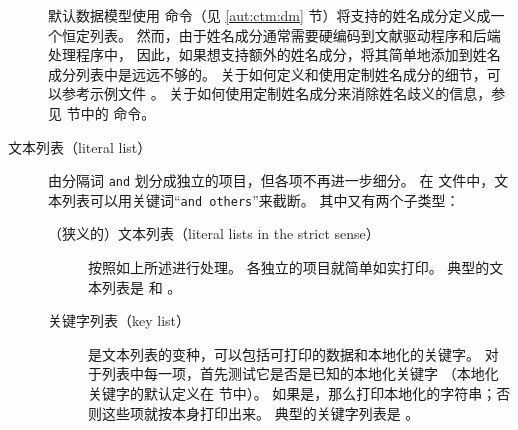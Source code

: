 \begin{description}

默认数据模型使用  命令（见 \ref{aut:ctm:dm} 节）将支持的姓名成分定义成一个恒定列表。
然而，由于姓名成分通常需要硬编码到文献驱动程序和后端处理程序中，
因此，如果想支持额外的姓名成分，将其简单地添加到姓名成分列表中是远远不够的。
关于如何定义和使用定制姓名成分的细节，可以参考示例文件 。
关于如何使用定制姓名成分来消除姓名歧义的信息，参见  节中的  命令。

\item[文本列表（literal list）] 由分隔词 \texttt{and} 划分成独立的项目，但各项不再进一步细分。
在  文件中，文本列表可以用关键词“\texttt{and others}”来截断。
其中又有两个子类型：

\begin{description}

\item[（狭义的）文本列表（literal lists in the strict sense）] 按照如上所述进行处理。
各独立的项目就简单如实打印。
典型的文本列表是  和 。

\item[关键字列表（key list）]  是文本列表的变种，可以包括可打印的数据和本地化的关键字。
对于列表中每一项，首先测试它是否是已知的本地化关键字
（本地化关键字的默认定义在  节中）。
如果是，那么打印本地化的字符串；否则这些项就按本身打印出来。
典型的关键字列表是 。

\end{description}
\end{description}

